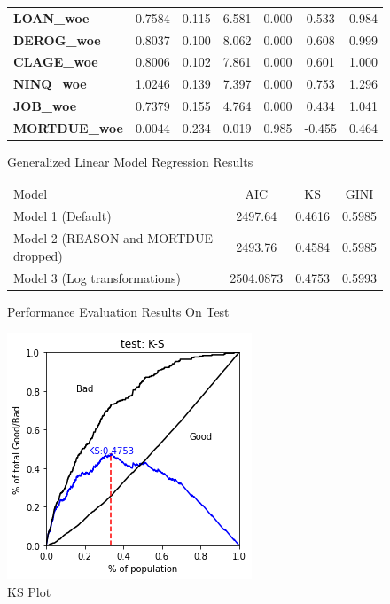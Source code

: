 \begin{figure}
\begin{center}
\begin{tabular}{lcccccc}
\textbf{LOAN\_woe}    &       0.7584  &        0.115     &     6.581  &         0.000        &        0.533    &        0.984     \\
\textbf{DEROG\_woe}   &       0.8037  &        0.100     &     8.062  &         0.000        &        0.608    &        0.999     \\
\textbf{CLAGE\_woe}   &       0.8006  &        0.102     &     7.861  &         0.000        &        0.601    &        1.000     \\
\textbf{NINQ\_woe}    &       1.0246  &        0.139     &     7.397  &         0.000        &        0.753    &        1.296     \\
\textbf{JOB\_woe}     &       0.7379  &        0.155     &     4.764  &         0.000        &        0.434    &        1.041     \\
\textbf{MORTDUE\_woe} &       0.0044  &        0.234     &     0.019  &         0.985        &       -0.455    &        0.464     \\
\bottomrule
\end{tabular}
\caption{Generalized Linear Model Regression Results \label{glm_out}}
\end{center}
\end{figure}

\begin{figure}
\begin{center}
\renewcommand{\arraystretch}{1.25}
\begin{tabular}{lccc}
\toprule
Model & AIC & KS & GINI \\
Model 1 (Default) & 2497.64 & 0.4616 & 0.5985 \\
Model 2 (REASON and MORTDUE dropped) & 2493.76 & 0.4584 & 0.5985 \\
Model 3 (Log transformations) & 2504.0873 & 0.4753 & 0.5993 \\
\bottomrule
\end{tabular}
\caption{Performance Evaluation Results On Test \label{perf_eval}}
\end{center}
\end{figure}

\begin{figure}[!ht]
	\centering
	\includegraphics[scale=0.90]{figs/ks_plot.png}
	\caption{KS Plot \label{ks_plot}}
\end{figure}

